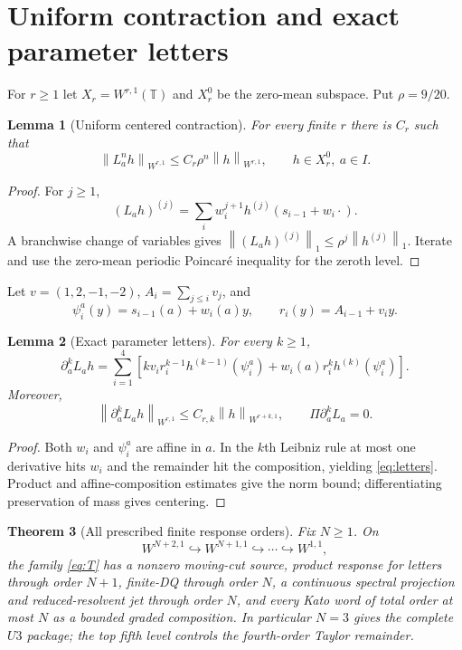 \documentclass[11pt,reqno]{amsart}
\newtheorem{theorem}{Theorem}[section]
\newtheorem{lemma}[theorem]{Lemma}
\theoremstyle{definition}
\theoremstyle{remark}
\newcommand{\T}{\mathbb T}
\newcommand{\Piop}{\Pi}
\newcommand{\norm}[1]{\left\lVert #1\right\rVert}
\begin{document}
\section{Uniform contraction and exact parameter letters}\label{sec:letters}
For $r\ge1$ let $X_r=W^{r,1}(\T)$ and $X_r^0$ be the zero-mean subspace.  Put
$\rho=9/20$.

\begin{lemma}[Uniform centered contraction]\label{lem:contraction}
For every finite $r$ there is $C_r$ such that
\[
 \norm{L_a^nh}_{W^{r,1}}
 \le C_r\rho^n\norm h_{W^{r,1}},
 \qquad h\in X_r^0,\ a\in I.
\]
\end{lemma}

\begin{proof}
For $j\ge1$,
\[
 (L_ah)^{(j)}=
 \sum_iw_i^{j+1}h^{(j)}(s_{i-1}+w_i\cdot).
\]
A branchwise change of variables gives
$\norm{(L_ah)^{(j)}}_1\le\rho^j\norm{h^{(j)}}_1$.
Iterate and use the zero-mean periodic Poincar\'e inequality for the zeroth
level.
\end{proof}

Let $v=(1,2,-1,-2)$, $A_i=\sum_{j\le i}v_j$, and
\[
 \psi_i^a(y)=s_{i-1}(a)+w_i(a)y,
 \qquad r_i(y)=A_{i-1}+v_i y.
\]

\begin{lemma}[Exact parameter letters]\label{lem:letters}
For every $k\ge1$,
\begin{equation}\label{eq:letters}
 \partial_a^kL_ah=
 \sum_{i=1}^4\left[
 kv_ir_i^{k-1}h^{(k-1)}(\psi_i^a)
 +w_i(a)r_i^kh^{(k)}(\psi_i^a)
 \right].
\end{equation}
Moreover,
\[
 \norm{\partial_a^kL_ah}_{W^{r,1}}
 \le C_{r,k}\norm h_{W^{r+k,1}},
 \qquad \Piop\partial_a^kL_a=0.
\]
\end{lemma}

\begin{proof}
Both $w_i$ and $\psi_i^a$ are affine in $a$.  In the $k$th Leibniz rule at
most one derivative hits $w_i$ and the remainder hit the composition, yielding
\eqref{eq:letters}.  Product and affine-composition estimates give the norm
bound; differentiating preservation of mass gives centering.
\end{proof}

\begin{theorem}[All prescribed finite response orders]\label{thm:allorder}
Fix $N\ge1$.  On
\[
 W^{N+2,1}\hookrightarrow W^{N+1,1}\hookrightarrow\cdots
 \hookrightarrow W^{1,1},
\]
the family \eqref{eq:T} has a nonzero moving-cut source, product response for
letters through order $N+1$, finite-DQ through order $N$, a continuous
spectral projection and reduced-resolvent jet through order $N$, and every
Kato word of total order at most $N$ as a bounded graded composition.  In
particular $N=3$ gives the complete $U3$ package; the top fifth level controls
the fourth-order Taylor remainder.
\end{theorem}
\end{document}
